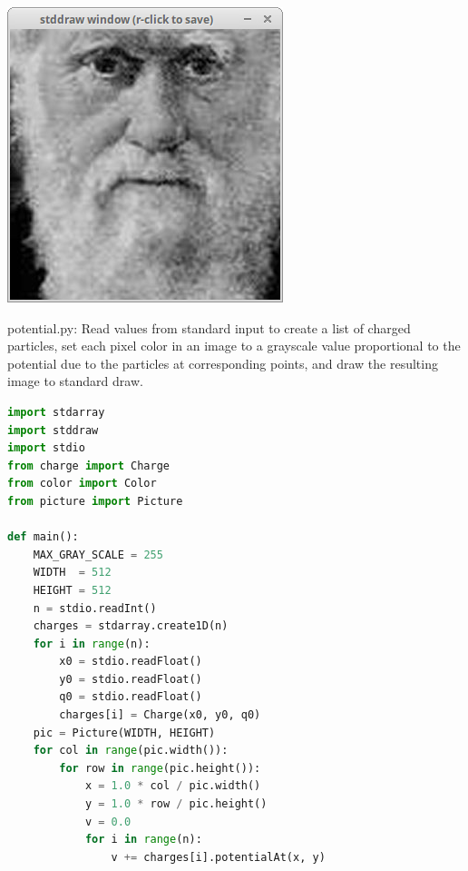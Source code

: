 \documentclass[8pt,a4paper,compress]{beamer}
\begin{document}
\begin{frame}[fragile]
\begin{minipage}{300pt}
{\begin{center}
\includegraphics[scale=0.15]{figures/fade6.png}
\end{center}}
\end{minipage}%
\end{frame}

\begin{frame}[fragile]
\pause

\begin{framed}
\tiny potential.py: Read values from standard input to create a list of charged particles, set each pixel color in an image to a grayscale value proportional to the potential due to the particles at corresponding points, and draw the resulting image to standard draw.
\end{framed}

\begin{lstlisting}[language=Python]
import stdarray
import stddraw
import stdio
from charge import Charge
from color import Color
from picture import Picture

def main():
    MAX_GRAY_SCALE = 255
    WIDTH  = 512
    HEIGHT = 512
    n = stdio.readInt()
    charges = stdarray.create1D(n)
    for i in range(n):
        x0 = stdio.readFloat()
        y0 = stdio.readFloat()
        q0 = stdio.readFloat()
        charges[i] = Charge(x0, y0, q0)
    pic = Picture(WIDTH, HEIGHT)
    for col in range(pic.width()):
        for row in range(pic.height()):
            x = 1.0 * col / pic.width()
            y = 1.0 * row / pic.height()
            v = 0.0
            for i in range(n):
                v += charges[i].potentialAt(x, y)    
\end{lstlisting}
\end{frame}
\end{document}
